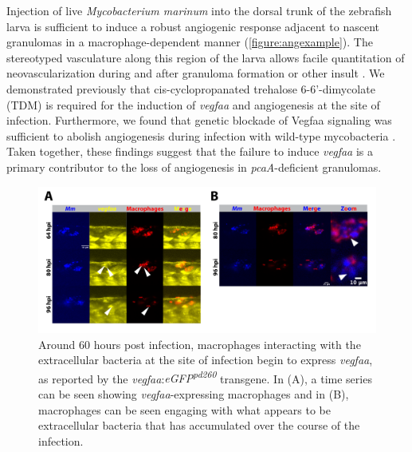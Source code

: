 Injection of live \textit{Mycobacterium marinum} into the dorsal trunk of the zebrafish larva is sufficient to induce a robust angiogenic response adjacent to nascent granulomas in a macrophage-dependent manner \citep{Oehlers2015} (\autoref{figure:angexample}). The stereotyped vasculature along this region of the larva allows facile quantitation of neovascularization during and after granuloma formation or other insult \citep{Lawson2002, Jin2005, Gore2012, Matsuoka2018}. We demonstrated previously that cis-cyclopropanated trehalose 6-6'-dimycolate (TDM) is required for the induction of \textit{vegfaa} and angiogenesis at the site of infection. Furthermore, we found that genetic blockade of Vegfaa signaling was sufficient to abolish angiogenesis during infection with wild-type mycobacteria \citep{Walton2018}. Taken together, these findings suggest that the failure to induce \textit{vegfaa} is a primary contributor to the loss of angiogenesis in \textit{pcaA}-deficient granulomas.

\begin{figure}
\centering
\includegraphics[width=\textwidth]{images/extracellularvegfa.pdf}
\caption{Around 60 hours post infection, macrophages interacting with the extracellular bacteria at the site of infection begin to express \textit{vegfaa}, as reported by the \textit{vegfaa}:\textit{eGFP\textsuperscript{pd260}} transgene. In (A), a time series can be seen showing \textit{vegfaa}-expressing macrophages and in (B), macrophages can be seen engaging with what appears to be extracellular bacteria that has accumulated over the course of the infection.}
\label{figure:ecvegfa}

\end{figure}

